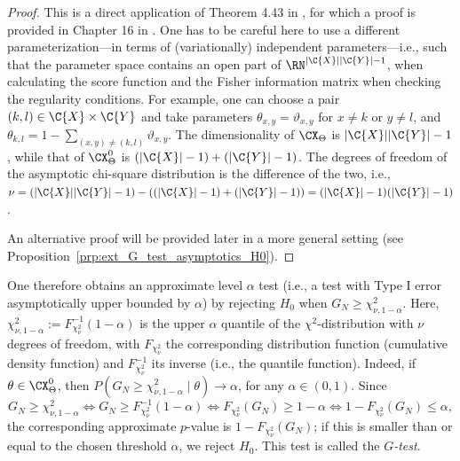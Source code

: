 \begin{proof}
This is a direct application of Theorem 4.43 in \cite{Bijma++2017}, for which a proof is
provided in Chapter 16 in \cite{Vandervaart1998}.
One has to be careful here to use a different parameterization---in
terms of (variationally) independent parameters---i.e.,
such that the parameter space contains an open part of $\RN^{|\C{X}||\C{Y}|-1}$,
when calculating the score function and the Fisher information matrix
when checking the regularity conditions.
For example, one can choose a pair $(k,l) \in \C{X} \times \C{Y}$ and take
parameters $\theta_{x,y} = \vartheta_{x,y}$ for $x \ne k$ or $y \ne l$, and
$\theta_{k,l} = 1 - \sum_{(x,y) \ne (k,l)} \vartheta_{x,y}$. 
The dimensionality of $\CX_\Theta$ is $|\C{X}||\C{Y}| - 1$, while
that of $\CX_\Theta^0$ is $(|\C{X}|-1) + (|\C{Y}|-1)$. The degrees
of freedom of the asymptotic chi-square distribution is the difference of the two, i.e.,
$\nu = (|\C{X}||\C{Y}|-1)   -   ((|\C{X}|-1) + (|\C{Y}|-1)) = (|\C{X}| - 1)(|\C{Y}| - 1)$.

An alternative proof will be provided later in a more general setting (see Proposition~\ref{prp:ext_G_test_asymptotics_H0}).
\end{proof}

One therefore obtains an approximate level $\alpha$ test (i.e., a test with Type I error asymptotically upper bounded by $\alpha$) 
by rejecting $H_0$ when $G_N \ge \chi_{\nu,1-\alpha}^2$. Here,
$\chi^2_{\nu,1-\alpha} := F_{\chi^2_\nu}^{-1}(1-\alpha)$ is the upper $\alpha$ quantile of the $\chi^2$-distribution with $\nu$ degrees of freedom, with $F_{\chi^2_\nu}$ the corresponding distribution function (cumulative density function) and $F^{-1}_{\chi^2_\nu}$ its inverse (i.e., the quantile function).
Indeed, if $\theta \in \CX_\Theta^0$, then $P(G_N \ge \chi_{\nu,1-\alpha}^2 \mid \theta) \to \alpha$, for any $\alpha \in (0,1)$.
Since 
$$G_N \ge \chi_{\nu,1-\alpha}^2 \iff G_N \ge F_{\chi^2_\nu}^{-1}(1-\alpha) \iff F_{\chi^2_\nu}(G_N) \ge 1-\alpha \iff 1-F_{\chi^2_\nu}(G_N) \le \alpha,$$
the corresponding approximate $p$-value is $1 - F_{\chi^2_\nu}(G_N)$; if this is smaller than or equal to the chosen threshold $\alpha$, 
we reject $H_0$.
This test is called the \emph{$G$-test}.

